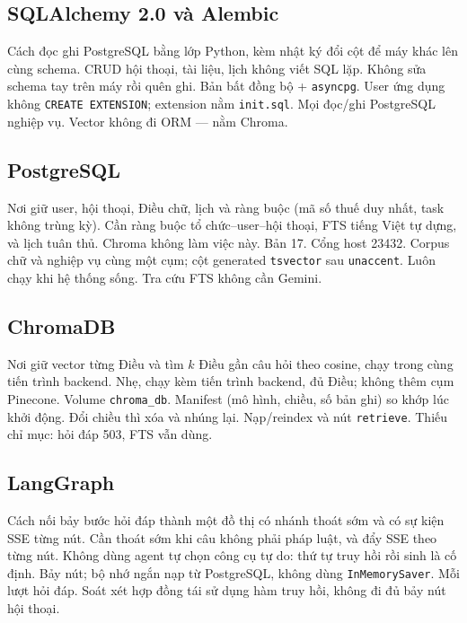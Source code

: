 \subsection{SQLAlchemy 2.0 và Alembic}

\boncau
{Cách đọc ghi PostgreSQL bằng lớp Python, kèm nhật ký đổi cột để máy khác lên
cùng schema.}
{CRUD hội thoại, tài liệu, lịch không viết SQL lặp. Không sửa schema tay trên
máy rồi quên ghi.}
{Bản bất đồng bộ + \texttt{asyncpg}. User ứng dụng không \texttt{CREATE EXTENSION};
extension nằm \texttt{init.sql}.}
{Mọi đọc/ghi PostgreSQL nghiệp vụ. Vector không đi ORM --- nằm Chroma.}

\subsection{PostgreSQL}

\boncau
{Nơi giữ user, hội thoại, Điều chữ, lịch và ràng buộc (mã số thuế duy nhất, task
không trùng kỳ).}
{Cần ràng buộc tổ chức--user--hội thoại, FTS tiếng Việt tự dựng, và lịch tuân
thủ. Chroma không làm việc này.}
{Bản 17. Cổng host 23432. Corpus chữ và nghiệp vụ cùng một cụm; cột generated
\texttt{tsvector} sau \texttt{unaccent}.}
{Luôn chạy khi hệ thống sống. Tra cứu FTS không cần Gemini.}

\subsection{ChromaDB}

\boncau
{Nơi giữ vector từng Điều và tìm $k$ Điều gần câu hỏi theo cosine, chạy trong
cùng tiến trình backend.}
{Nhẹ, chạy kèm tiến trình backend, đủ \soDieu{} Điều; không thêm cụm Pinecone.}
{Volume \texttt{chroma\_db}. Manifest (mô hình, chiều, số bản ghi) so khớp lúc
khởi động. Đổi chiều thì xóa và nhúng lại.}
{Nạp/reindex và nút \texttt{retrieve}. Thiếu chỉ mục: hỏi đáp 503, FTS vẫn dùng.}

\subsection{LangGraph}

\boncau
{Cách nối bảy bước hỏi đáp thành một đồ thị có nhánh thoát sớm và có sự kiện
SSE từng nút.}
{Cần thoát sớm khi câu không phải pháp luật, và đẩy SSE theo từng nút. Không
dùng agent tự chọn công cụ tự do: thứ tự truy hồi rồi sinh là cố định.}
{Bảy nút; bộ nhớ ngắn nạp từ PostgreSQL, không dùng \texttt{InMemorySaver}.}
{Mỗi lượt hỏi đáp. Soát xét hợp đồng tái sử dụng hàm truy hồi, không đi đủ bảy
nút hội thoại.}

